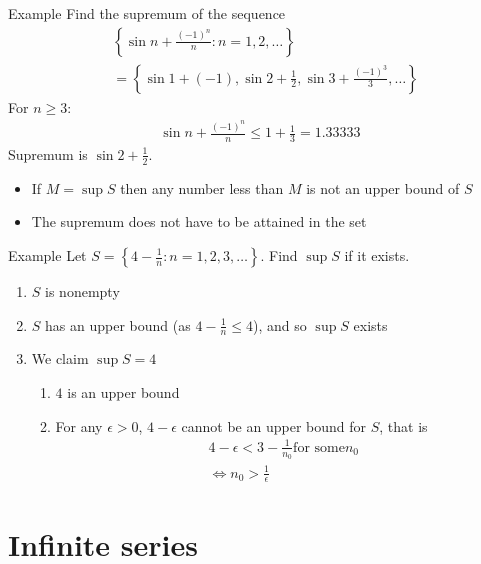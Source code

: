 \documentclass{report}
\begin{document}
			\begin{question}{Example}
				Find the supremum of the sequence
				\begin{align*}
					&\left\{ \sin n + \frac{(-1)^n}{n} : n = 1,2,\dots \right\}	\\
					&= \left\{ \sin 1 + (-1), \sin 2 + \frac{1}{2}, \sin 3 + \frac{(-1)^3}{3}, \dots \right\}
				\end{align*}
				For $n \geq 3$:
				\begin{align*}
					\sin n + \frac{(-1)^n}{n} \leq 1 + \frac{1}{3} = 1.33333
				\end{align*}
				Supremum is $\sin 2 + \frac{1}{2}$.
			\end{question}

			\begin{itemize}
				\item If $M = \sup S$  then any number less than $M$ is not an upper bound of $S$
				\item The supremum does not have to be attained in the set
			\end{itemize}

			\begin{question}{Example}
				Let $S = \left\{4 - \frac{1}{n} : n = 1,2,3,\dots \right\}$. Find $\sup S$ if it exists.
				\begin{enumerate}
					\item $S$ is nonempty
					\item $S$ has an upper bound (as $4 - \frac{1}{n} \leq 4$), and so $\sup S$ exists
					\item We claim $\sup S = 4$
						\begin{enumerate}
							\item $4$ is an upper bound
							\item For any $\epsilon > 0$, $4 - \epsilon$ cannot be an upper bound for $S$, that is
								\begin{align*}
									4 - \epsilon < 3 - \frac{1}{n_0} \text{for some} n_0 \\
									\Leftrightarrow n_0 > \frac{1}{\epsilon}
								\end{align*}
						\end{enumerate}
				\end{enumerate}
			\end{question}

\chapter{Infinite series}
\end{document}

